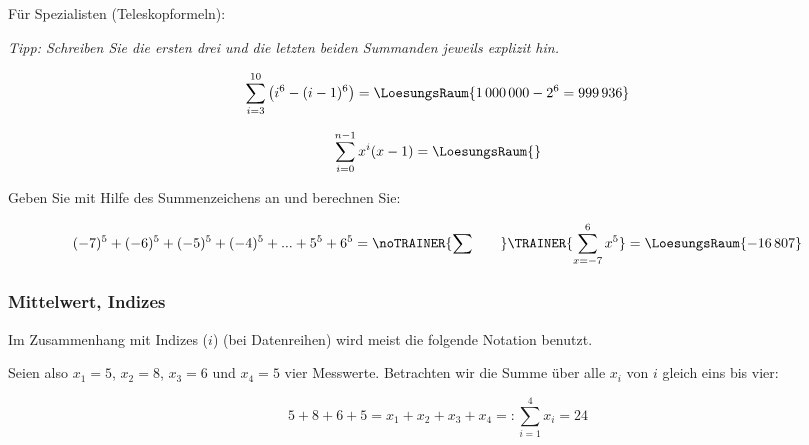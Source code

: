 Für Spezialisten (Teleskopformeln):

\textit{Tipp: Schreiben Sie die ersten drei und die letzten beiden Summanden
  jeweils explizit hin.}

$$\sum_{i=3}^{10}\left(i^6 - ( i-1 )^6\right) = \LoesungsRaum{1\,000\,000 - 2^6 = 999\,936}$$
  


$$\sum_{i=0}^{n-1}x^i(x-1)=\LoesungsRaum{}$$


\newpage


Geben Sie mit Hilfe des Summenzeichens an und berechnen Sie:

$$(-7)^5 + (-6)^5 + (-5)^5 + (-4)^5 + ... + 5^5+6^5 = \noTRAINER{\sum_{}^{}\hspace{7mm}}\TRAINER{\sum_{x=-7}^{6}x^5} = \LoesungsRaum{-16\,807}$$



\newpage



\subsubsection{Mittelwert, Indizes}
Im Zusammenhang mit Indizes ($i$) (\zB bei Datenreihen) wird meist die
folgende Notation benutzt.

Seien also $x_1=5$, $x_2=8$, $x_3=6$ und $x_4=5$ vier
Messwerte. Betrachten wir die Summe über
alle $x_i$ von $i$ gleich eins bis vier:

$$5+8+6+5 = x_1 + x_2 + x_3 + x_4 =: \sum_{i=1}^4{x_i}=24$$


